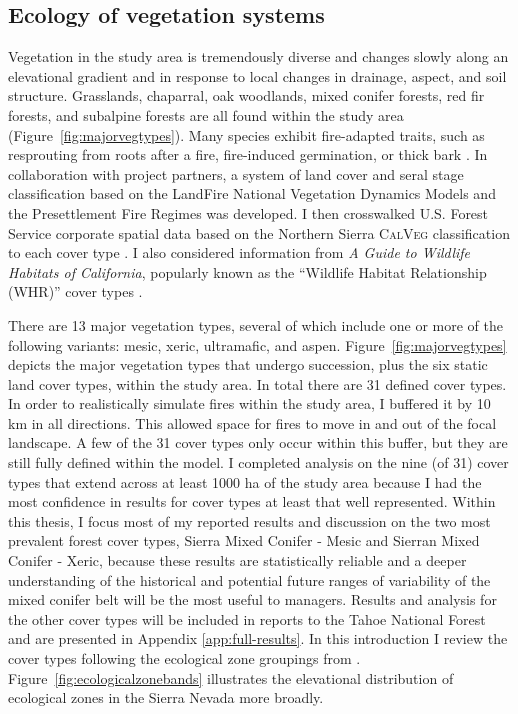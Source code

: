 
\subsection{Ecology of vegetation systems}
Vegetation in the study area is tremendously diverse and changes slowly along an elevational gradient and in response to local changes in drainage, aspect, and soil structure. Grasslands, chaparral, oak woodlands, mixed conifer forests, red fir forests, and subalpine forests are all found within the study area (Figure~\ref{fig:majorvegtypes}). Many species exhibit fire-adapted traits, such as resprouting from roots after a fire, fire-induced germination, or thick bark \citep{VanWag2006}. In collaboration with project partners, a system of land cover and seral stage classification based on the LandFire National Vegetation Dynamics Models \citeyearpar{Landfire2007} and the \citet{VandeWater2011} Presettlement Fire Regimes was developed. I then crosswalked U.S. Forest Service corporate spatial data based on the Northern Sierra \textsc{CalVeg} classification to each cover type \citep{USDAForestService2008}. I also considered information from \emph{A Guide to Wildlife Habitats of California}, popularly known as the ``Wildlife Habitat Relationship (WHR)'' cover types \citep{WHR1988}. 

There are 13 major vegetation types, several of which include one or more of the following variants: mesic, xeric, ultramafic, and aspen. Figure~\ref{fig:majorvegtypes} depicts the major vegetation types that undergo succession, plus the six static land cover types, within the study area. In total there are 31 defined cover types. In order to realistically simulate fires within the study area, I buffered it by 10 km in all directions. This allowed space for fires to move in and out of the focal landscape. A few of the 31 cover types only occur within this buffer, but they are still fully defined within the model. I completed analysis on the nine (of 31) cover types that extend across at least 1000 ha of the study area because I had the most confidence in results for cover types at least that well represented. Within this thesis, I focus most of my reported results and discussion on the two most prevalent forest cover types, Sierra Mixed Conifer - Mesic and Sierran Mixed Conifer - Xeric, because these results are statistically reliable and a deeper understanding of the historical and potential future ranges of variability of the mixed conifer belt will be the most useful to managers. Results and analysis for the other cover types will be included in reports to the Tahoe National Forest and are presented in Appendix \ref{app:full-results}. In this introduction I review the cover types following the ecological zone groupings from \citet{VanWag2006}. Figure~\ref{fig:ecologicalzonebands} illustrates the elevational distribution of ecological zones in the Sierra Nevada more broadly.



